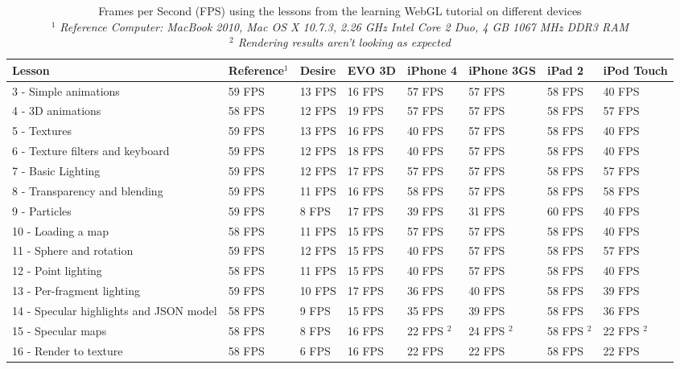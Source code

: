 \documentclass[12pt,journal,compsoc]{IEEEtran}
\begin{document}
\begin{table}[tb]
	\begin{centering}
	\begin{tabular}{l|l|l|l|l|l|l|l}
		\textbf{Lesson}								& \textbf{Reference$^{1}$}& \textbf{Desire}		& \textbf{EVO 3D}		& \textbf{iPhone 4}		& \textbf{iPhone 3GS}	& \textbf{iPad 2}	& \textbf{iPod Touch}\\
		\hline
		3 - Simple animations						& 59 FPS		& 13 FPS		& 16 FPS		& 57 FPS		& 57 FPS		& 58 FPS	& 40 FPS				\\
		4 - 3D animations							& 58 FPS		& 12 FPS		& 19 FPS		& 57 FPS		& 57 FPS		& 58 FPS	& 57 FPS				\\
		5 - Textures								& 59 FPS		& 13 FPS		& 16 FPS		& 40 FPS		& 57 FPS		& 58 FPS	& 40 FPS				\\
		6 - Texture filters and keyboard			& 59 FPS		& 12 FPS		& 18 FPS		& 40 FPS		& 57 FPS		& 58 FPS	& 40 FPS				\\
		7 - Basic Lighting							& 59 FPS		& 12 FPS		& 17 FPS		& 57 FPS		& 57 FPS		& 58 FPS	& 57 FPS				\\
		8 - Transparency and blending				& 59 FPS		& 11 FPS		& 16 FPS		& 58 FPS		& 57 FPS		& 58 FPS	& 58 FPS				\\
		9 - Particles								& 59 FPS		&  8 FPS		& 17 FPS		& 39 FPS		& 31 FPS		& 60 FPS	& 40 FPS				\\
		10 - Loading a map							& 58 FPS		& 11 FPS		& 15 FPS		& 57 FPS		& 57 FPS		& 58 FPS	& 40 FPS				\\
		11 - Sphere and rotation					& 59 FPS		& 12 FPS		& 15 FPS		& 40 FPS		& 57 FPS		& 58 FPS	& 57 FPS				\\
		12 - Point lighting							& 58 FPS		& 11 FPS		& 15 FPS		& 40 FPS		& 57 FPS		& 58 FPS	& 40 FPS				\\
		13 - Per-fragment lighting					& 59 FPS		& 10 FPS		& 17 FPS		& 36 FPS		& 40 FPS		& 58 FPS	& 39 FPS				\\
		14 - Specular highlights and JSON model		& 58 FPS		&  9 FPS		& 15 FPS		& 35 FPS		& 39 FPS		& 58 FPS	& 36 FPS				\\
		15 - Specular maps							& 58 FPS		&  8 FPS		& 16 FPS		& 22 FPS $^{2}$	& 24 FPS $^{2}$	& 58 FPS $^{2}$	& 22 FPS $^{2}$ 		\\
		16 - Render to texture						& 58 FPS		&  6 FPS		& 16 FPS		& 22 FPS		& 22 FPS		& 58 FPS	& 22 FPS				\\
	\end{tabular}
	\caption{Frames per Second (FPS) using the lessons from the learning WebGL tutorial on different devices\label{lessonsTable}
	\\\textit{$^{1}$ Reference Computer: MacBook 2010, Mac OS X 10.7.3, 2.26 GHz Intel Core 2 Duo, 4 GB 1067 MHz DDR3 RAM}
	\\\textit{$^{2}$ Rendering results aren't looking as expected}
	}
	\end{centering}
\end{table}
\end{document}
